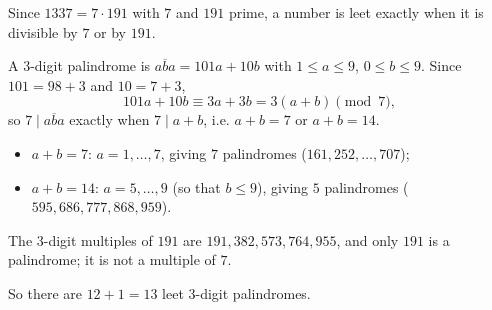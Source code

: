 Since $1337=7\cdot191$ with $7$ and $191$ prime, a number is leet exactly when it is divisible by $7$ or by $191$.

A $3$-digit palindrome is $\overline{aba}=101a+10b$ with $1\le a\le9$, $0\le b\le9$. Since $101=98+3$ and $10=7+3$,
\[101a+10b\equiv3a+3b=3(a+b)\pmod7,\]
so $7\mid\overline{aba}$ exactly when $7\mid a+b$, i.e. $a+b=7$ or $a+b=14$.
\begin{itemize}
\item $a+b=7$: $a=1,\dots,7$, giving $7$ palindromes ($161,252,\dots,707$);
\item $a+b=14$: $a=5,\dots,9$ (so that $b\le9$), giving $5$ palindromes ($595,686,777,868,959$).
\end{itemize}
The $3$-digit multiples of $191$ are $191,382,573,764,955$, and only $191$ is a palindrome; it is not a multiple of $7$.

So there are $12+1=\boxed{13}$ leet $3$-digit palindromes.
